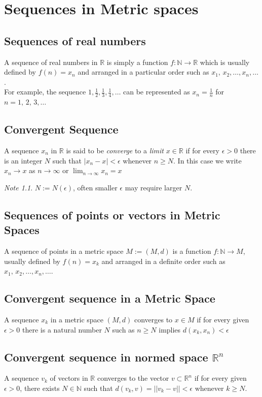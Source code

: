 \documentclass[12pt,oneside,a4paper]{book}
\newcommand{\R}{\mathds{R}}
\newcommand{\N}{\mathds{N}}
\newcommand{\xn}[2]{{#1}_1{#2}\,{#1}_2{#2}\dots{#2}{#1}_n}
\newcommand{\abs}[1]{\left\vert#1\right\vert}
\newcommand{\norm}[1]{\left\vert\left\vert#1\right\vert\right\vert}
\theoremstyle{remark}
\newtheorem* {note}{Note}
\theoremstyle{definition}
\begin{document}
\chapter{Sequences in Metric spaces}
\section{Sequences of real numbers}
A sequence of real numbers in $ \R $ is simply a function $ f:\N\to\R $ which is usually defined by $ f(n)=x_n $ and arranged in a particular order such as $ \xn{x}{,},\dots $.\\

For example, the sequence $ 1,\frac{1}{2},\frac{1}{3},\frac{1}{4},\dots $ can be represented as $ x_n=\frac{1}{n} $ for $ n=1,\,2,\,3,\dots $
\section{Convergent Sequence}
A sequence $ x_n $ in $ \R $ is said to be \emph{converge} to a \emph{limit} $ x\in \R $ if for every $ \epsilon>0 $ there is an integer $ N $ such that $ \abs{x_n-x}<\epsilon $ whenever $ n\geq N $. In this case we write $ x_n \to x $ as $ n\to \infty $ or $ \lim_{n \to \infty} x_n=x$
\begin{note}
    $ N:=N(\epsilon) $, often smaller $ \epsilon $ may require larger $ N $.
\end{note}
\section{Sequences of points or vectors in Metric Spaces}
A sequence of points in a metric space $ M:=(M,d) $ is a function $ f:\N\to M $, usually defined by $ f(n)=x_k $ and arranged in a definite order such as $ \xn{x}{,},\dots $.
\section{Convergent sequence in a Metric Space}
A sequence $ x_k $ in a metric space $ (M, d) $ converges to $ x\in M $ if for every given $ \epsilon>0 $ there is a natural number $ N $ such as $ n\geq N $ implies $ d(x_k,x_n)<\epsilon $
\section{Convergent sequence in normed space $ \R^n $} 
A sequence $ v_k $ of vectors in $ \R $ converges to the vector $ v\subset \R^n $ if for every given $ \epsilon>0 $, there exists $ N\in\N $ such that $ d(v_k,v)=\norm{v_k-v}<\epsilon $ whenever $ k\geq N $.
\end{document}
